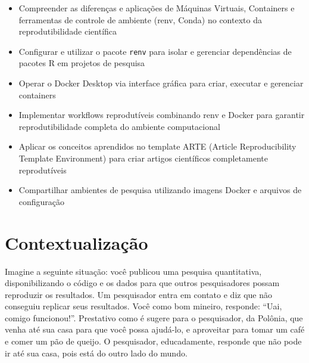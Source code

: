 \documentclass[
  a4paper,
]{book}
\providecommand{\tightlist}{%
  \setlength{\itemsep}{0pt}\setlength{\parskip}{0pt}}\usepackage{longtable,booktabs,array}
\newcommand{\emojitext}[1]{{\emoji #1}}
\begin{document}
\begin{tcolorbox}[enhanced jigsaw, colback=white, toptitle=1mm, opacityback=0, left=2mm, rightrule=.15mm, title={\emojitext{🎯} Ao final deste módulo, você será capaz de:}, coltitle=black, opacitybacktitle=0.6, breakable, toprule=.15mm, bottomtitle=1mm, titlerule=0mm, bottomrule=.15mm, arc=.35mm, leftrule=.75mm, colframe=quarto-callout-tip-color-frame, colbacktitle=quarto-callout-tip-color!10!white]

\begin{itemize}
\tightlist
\item
  Compreender as diferenças e aplicações de Máquinas Virtuais,
  Containers e ferramentas de controle de ambiente (renv, Conda) no
  contexto da reprodutibilidade científica
\item
  Configurar e utilizar o pacote \texttt{renv} para isolar e gerenciar
  dependências de pacotes R em projetos de pesquisa
\item
  Operar o Docker Desktop via interface gráfica para criar, executar e
  gerenciar containers
\item
  Implementar workflows reprodutíveis combinando renv e Docker para
  garantir reprodutibilidade completa do ambiente computacional
\item
  Aplicar os conceitos aprendidos no template ARTE (Article
  Reproducibility Template Environment) para criar artigos científicos
  completamente reprodutíveis
\item
  Compartilhar ambientes de pesquisa utilizando imagens Docker e
  arquivos de configuração
\end{itemize}

\end{tcolorbox}

\section{Contextualização}\label{contextualizauxe7uxe3o-6}

Imagine a seguinte situação: você publicou uma pesquisa quantitativa,
disponibilizando o código e os dados para que outros pesquisadores
possam reproduzir os resultados. Um pesquisador entra em contato e diz
que não conseguiu replicar seus resultados. Você como bom mineiro,
responde: ``Uai, comigo funcionou!''. Prestativo como é sugere para o
pesquisador, da Polônia, que venha até sua casa para que você possa
ajudá-lo, e aproveitar para tomar um café e comer um pão de queijo. O
pesquisador, educadamente, responde que não pode ir até sua casa, pois
está do outro lado do mundo.
\end{document}
